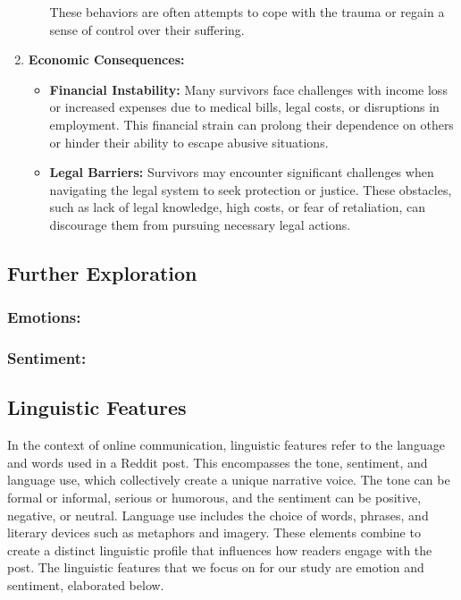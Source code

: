 \documentclass[11pt]{article}
\begin{document}
\begin{enumerate}
\begin{itemize}
        These behaviors are often attempts to cope with the trauma or regain a sense of control over their suffering.
    \end{itemize}
    \item \textbf{Economic Consequences:} 
    \begin{itemize}
        \item \textbf{Financial Instability:} Many survivors face challenges with income loss or increased expenses due to medical bills, legal costs, or disruptions in employment. 
        This financial strain can prolong their dependence on others or hinder their ability to escape abusive situations.
        \item \textbf{Legal Barriers:} Survivors may encounter significant challenges when navigating the legal system to seek protection or justice. 
        These obstacles, such as lack of legal knowledge, high costs, or fear of retaliation, can discourage them from pursuing necessary legal actions.
    \end{itemize}
\end{enumerate}

    
\subsection{Further Exploration}

\subsubsection{Emotions:}

\subsubsection{Sentiment:}

\subsection{Linguistic Features}

In the context of online communication, linguistic features refer to the language and words used in a Reddit post. This encompasses the tone, sentiment, and language use, which collectively create a unique narrative voice. The tone can be formal or informal, serious or humorous, and the sentiment can be positive, negative, or neutral. Language use includes the choice of words, phrases, and literary devices such as metaphors and imagery. These elements combine to create a distinct linguistic profile that influences how readers engage with the post. The linguistic features that we focus on for our study are emotion and sentiment, elaborated below.
\end{document}

